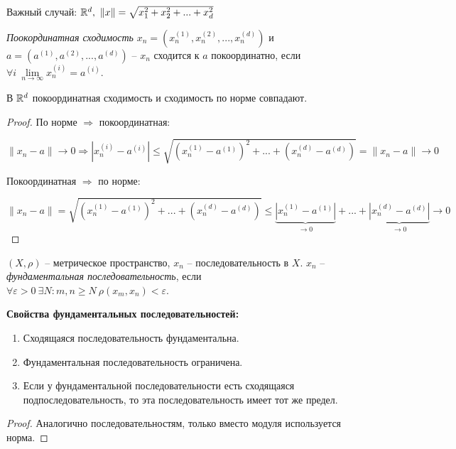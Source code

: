 Важный случай: $\R^d,\ \|x\|=\sqrt{x_1^2+x_2^2+...+x_d^2}$

\begin{definition}
    \textit{Поокординатная сходимость} $x_n=(x_n^{(1)}, x_n^{(2)}, ..., x_n^{(d)})$ и $a=(a^{(1)}, a^{(2)}, ..., a^{(d)})$ – $x_n$ сходится к $a$ покоординатно, если $\forall i \ \lim\limits_{n\rightarrow \infty}x_n^{(i)}=a^{(i)}$.
\end{definition}

\begin{theorem}
    В $\mathbb{R}^d$ покоординатная сходимость и сходимость по норме совпадают.
\end{theorem}

\begin{proof}
    По норме $\Rightarrow$ покоординатная:
    
    $\|x_n-a\|\rightarrow 0\Rightarrow|x_n^{(i)}-a^{(i)}|\leq \sqrt{(x_n^{(1)}-a^{(1)})^2+...+(x_n^{(d)}-a^{(d)})}=\|x_n-a\|\rightarrow0$

    Покоординатная $\Rightarrow$ по норме:

    $\|x_n-a\|=\sqrt{(x_n^{(1)}-a^{(1)})^2+...+(x_n^{(d)}-a^{(d)})}\leq \underbrace{|x_n^{(1)}-a^{(1)}|}_{\rightarrow 0}+...+\underbrace{|x_n^{(d)}-a^{(d)}|}_{\rightarrow 0}\rightarrow 0$
\end{proof}

\begin{definition}
    $(X, \rho)$ – метрическое пространство, $x_n$ – последовательность в $X$. $x_n$ – \textit{фундаментальная последовательность}, если $\forall\varepsilon>0\ \exists N:m, n\geq N\ \rho(x_m, x_n)<\varepsilon$.
\end{definition}

\begin{statement}
    \textbf{Свойства фундаментальных последовательностей:}
    \begin{enumerate}
        \item Сходящаяся последовательность фундаментальна.
        \item Фундаментальная последовательность ограничена.
        \item Если у фундаментальной последовательности есть сходящаяся подпоследовательность, то эта последовательность имеет тот же предел.
    \end{enumerate}
\end{statement}

\begin{proof}
    Аналогично последовательностям, только вместо модуля используется норма.
\end{proof}

